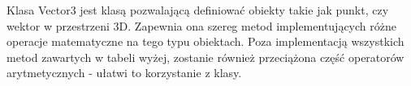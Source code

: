 Klasa Vector3 jest klasą pozwalającą definiować obiekty takie jak punkt, czy wektor w przestrzeni 3D. Zapewnia ona szereg metod implementujących różne operacje matematyczne na tego typu obiektach. Poza implementacją wszystkich metod zawartych w tabeli wyżej, zostanie również przeciążona część operatorów arytmetycznych - ułatwi to korzystanie z klasy.
